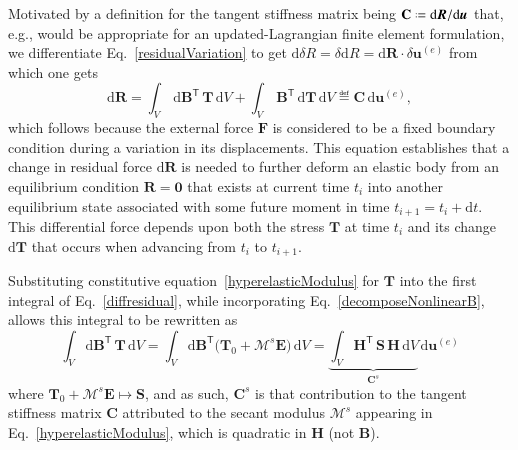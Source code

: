 Motivated by a definition for the tangent stiffness matrix being $\mathbf{C} \defeq \mathrm{d}\boldsymbol{R} / \mathrm{d}\boldsymbol{u}$ that, e.g., would be appropriate for an updated-Lagrangian finite element formulation, \cite{Belytschkoetal00} we differentiate Eq.~\ref{residualVariation} to get $\mathrm{d} \delta R = \delta \mathrm{d} R = \mathrm{d} \boldsymbol{R} \cdot \delta \boldsymbol{u}^{(e)}$ from which one gets
\begin{equation}
    \mathrm{d} \boldsymbol{R} = \int_{V} \, \mathrm{d} \mathbf{B}^{\mathsf{T}} \, \boldsymbol{T} \, \mathrm{d} V + \int_{V} \, \mathbf{B}^{\mathsf{T}} \, \mathrm{d} \boldsymbol{T} \, \mathrm{d} V \eqdef \mathbf{C} \, \mathrm{d} \boldsymbol{u}^{(e)} ,
    \label{diffresidual}
\end{equation}
which follows because the external force $\boldsymbol{F}$ is considered to be a fixed boundary condition during a variation in its displacements.  This equation establishes that a change in residual force $\mathrm{d}\boldsymbol{R}$ is needed to further deform an elastic body from an equilibrium condition $\boldsymbol{R} = \mathbf{0}$ that exists at current time $t_i$ into another equilibrium state associated with some future moment in time $t_{i+1} = t_i + \mathrm{d}t$.  This differential force depends upon both the stress $\boldsymbol{T}$ at time $t_i$ and its change $\mathrm{d} \boldsymbol{T}$ that occurs when advancing from $t_i$ to $t_{i+1}$.

Substituting constitutive equation~\ref{hyperelasticModulus} for $\boldsymbol{T}$ into the first integral of Eq.~\ref{diffresidual}, while incorporating Eq.~\ref{decomposeNonlinearB}, allows this integral to be rewritten as
\begin{equation}
\int_V \mathrm{d} \mathbf{B}^{\mathsf{T}} \, \boldsymbol{T} \, \mathrm{d}V =
\int_V \mathrm{d} \mathbf{B}^{\mathsf{T}} \bigl( \boldsymbol{T}_0 + 
\boldsymbol{\mathcal{M}}^s \boldsymbol{E} \bigr) \, \mathrm{d}V =  
\underbrace{\int_V \mathbf{H}^{\mathsf{T}} \, \mathbf{S} \, \mathbf{H} \, \mathrm{d}V}_{\mathbf{C}^s}  \, \mathrm{d} \boldsymbol{u}^{(e)}
\label{secantStiffness}
\end{equation}
where $\boldsymbol{T}_0 + \boldsymbol{\mathcal{M}}^s \boldsymbol{E} \mapsto \mathbf{S}$, and as such, $\mathbf{C}^s$ is that contribution to the tangent stiffness matrix $\mathbf{C}$ attributed to the secant modulus $\boldsymbol{\mathcal{M}}^s$ appearing in Eq.~\ref{hyperelasticModulus}, which is quadratic in $\mathbf{H}$ (not $\mathbf{B}$).


